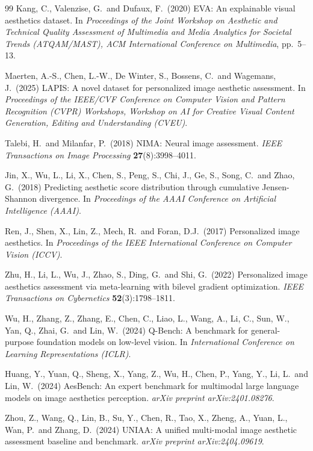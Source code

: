 \documentclass{article}
\begin{document}
\begin{thebibliography}{99}
Kang, C., Valenzise, G.\ and Dufaux, F.\ (2020)
EVA: An explainable visual aesthetics dataset.
In {\it Proceedings of the Joint Workshop on Aesthetic and Technical Quality Assessment of
Multimedia and Media Analytics for Societal Trends (ATQAM/MAST), ACM International Conference
on Multimedia}, pp.\ 5--13.

Maerten, A.-S., Chen, L.-W., De Winter, S., Bossens, C.\ and Wagemans, J.\ (2025)
LAPIS: A novel dataset for personalized image aesthetic assessment.
In {\it Proceedings of the IEEE/CVF Conference on Computer Vision and Pattern Recognition (CVPR)
Workshops, Workshop on AI for Creative Visual Content Generation, Editing and Understanding (CVEU)}.

Talebi, H.\ and Milanfar, P.\ (2018)
NIMA: Neural image assessment.
{\it IEEE Transactions on Image Processing} {\bf 27}(8):3998--4011.

Jin, X., Wu, L., Li, X., Chen, S., Peng, S., Chi, J., Ge, S., Song, C.\ and Zhao, G.\ (2018)
Predicting aesthetic score distribution through cumulative Jensen-Shannon divergence.
In {\it Proceedings of the AAAI Conference on Artificial Intelligence (AAAI)}.

Ren, J., Shen, X., Lin, Z., Mech, R.\ and Foran, D.J.\ (2017)
Personalized image aesthetics.
In {\it Proceedings of the IEEE International Conference on Computer Vision (ICCV)}.

Zhu, H., Li, L., Wu, J., Zhao, S., Ding, G.\ and Shi, G.\ (2022)
Personalized image aesthetics assessment via meta-learning with bilevel gradient optimization.
{\it IEEE Transactions on Cybernetics} {\bf 52}(3):1798--1811.

Wu, H., Zhang, Z., Zhang, E., Chen, C., Liao, L., Wang, A., Li, C., Sun, W., Yan, Q., Zhai, G.\
and Lin, W.\ (2024)
Q-Bench: A benchmark for general-purpose foundation models on low-level vision.
In {\it International Conference on Learning Representations (ICLR)}.

Huang, Y., Yuan, Q., Sheng, X., Yang, Z., Wu, H., Chen, P., Yang, Y., Li, L.\ and Lin, W.\ (2024)
AesBench: An expert benchmark for multimodal large language models on image aesthetics perception.
{\it arXiv preprint arXiv:2401.08276}.

Zhou, Z., Wang, Q., Lin, B., Su, Y., Chen, R., Tao, X., Zheng, A., Yuan, L., Wan, P.\ and
Zhang, D.\ (2024)
UNIAA: A unified multi-modal image aesthetic assessment baseline and benchmark.
{\it arXiv preprint arXiv:2404.09619}.


\end{thebibliography}
\end{document}
